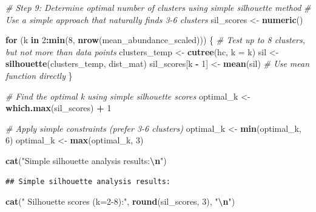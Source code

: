 \documentclass[
]{article}
\newenvironment{Shaded}{\begin{snugshade}}{\end{snugshade}}
\newcommand{\AttributeTok}[1]{\textcolor[rgb]{0.13,0.29,0.53}{#1}}
\newcommand{\CommentTok}[1]{\textcolor[rgb]{0.56,0.35,0.01}{\textit{#1}}}
\newcommand{\ControlFlowTok}[1]{\textcolor[rgb]{0.13,0.29,0.53}{\textbf{#1}}}
\newcommand{\DecValTok}[1]{\textcolor[rgb]{0.00,0.00,0.81}{#1}}
\newcommand{\FunctionTok}[1]{\textcolor[rgb]{0.13,0.29,0.53}{\textbf{#1}}}
\newcommand{\NormalTok}[1]{#1}
\newcommand{\OtherTok}[1]{\textcolor[rgb]{0.56,0.35,0.01}{#1}}
\newcommand{\SpecialCharTok}[1]{\textcolor[rgb]{0.81,0.36,0.00}{\textbf{#1}}}
\newcommand{\StringTok}[1]{\textcolor[rgb]{0.31,0.60,0.02}{#1}}
\begin{document}
\begin{Shaded}
\begin{Highlighting}[]
\CommentTok{\# Step 9: Determine optimal number of clusters using simple silhouette method}
\CommentTok{\# Use a simple approach that naturally finds 3{-}6 clusters}
\NormalTok{sil\_scores }\OtherTok{\textless{}{-}} \FunctionTok{numeric}\NormalTok{()}

\ControlFlowTok{for}\NormalTok{ (k }\ControlFlowTok{in} \DecValTok{2}\SpecialCharTok{:}\FunctionTok{min}\NormalTok{(}\DecValTok{8}\NormalTok{, }\FunctionTok{nrow}\NormalTok{(mean\_abundance\_scaled))) \{  }\CommentTok{\# Test up to 8 clusters, but not more than data points}
\NormalTok{  clusters\_temp }\OtherTok{\textless{}{-}} \FunctionTok{cutree}\NormalTok{(hc, }\AttributeTok{k =}\NormalTok{ k)}
\NormalTok{  sil }\OtherTok{\textless{}{-}} \FunctionTok{silhouette}\NormalTok{(clusters\_temp, dist\_mat)}
\NormalTok{  sil\_scores[k }\SpecialCharTok{{-}} \DecValTok{1}\NormalTok{] }\OtherTok{\textless{}{-}} \FunctionTok{mean}\NormalTok{(sil)  }\CommentTok{\# Use mean function directly}
\NormalTok{\}}

\CommentTok{\# Find the optimal k using simple silhouette scores}
\NormalTok{optimal\_k }\OtherTok{\textless{}{-}} \FunctionTok{which.max}\NormalTok{(sil\_scores) }\SpecialCharTok{+} \DecValTok{1}

\CommentTok{\# Apply simple constraints (prefer 3{-}6 clusters)}
\NormalTok{optimal\_k }\OtherTok{\textless{}{-}} \FunctionTok{min}\NormalTok{(optimal\_k, }\DecValTok{6}\NormalTok{)}
\NormalTok{optimal\_k }\OtherTok{\textless{}{-}} \FunctionTok{max}\NormalTok{(optimal\_k, }\DecValTok{3}\NormalTok{)}

\FunctionTok{cat}\NormalTok{(}\StringTok{"Simple silhouette analysis results:}\SpecialCharTok{\textbackslash{}n}\StringTok{"}\NormalTok{)}
\end{Highlighting}
\end{Shaded}

\begin{verbatim}
## Simple silhouette analysis results:
\end{verbatim}

\begin{Shaded}
\begin{Highlighting}[]
\FunctionTok{cat}\NormalTok{(}\StringTok{"  Silhouette scores (k=2{-}8):"}\NormalTok{, }\FunctionTok{round}\NormalTok{(sil\_scores, }\DecValTok{3}\NormalTok{), }\StringTok{"}\SpecialCharTok{\textbackslash{}n}\StringTok{"}\NormalTok{)}
\end{Highlighting}
\end{Shaded}
\end{document}
